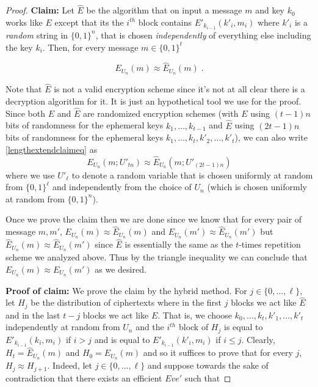 \begin{proof}
\textbf{Claim:} Let \(\hat{E}\) be the algorithm that on input a message
\(m\) and key \(k_0\) works like \(E\) except that its the \(i^{th}\)
block contains \(E'_{k_{i-1}}(k'_i,m_i)\) where \(k'_i\) is a
\emph{random} string in \({\{0,1\}}^n\), that is chosen
\emph{independently} of everything else including the key \(k_i\). Then,
for every message \(m\in{\{0,1\}}^t\)

\[
E_{U_n}(m) \approx \hat{E}_{U_n}(m)  \label{lengthextendclaimeq} \;.
\]

Note that \(\hat{E}\) is not a valid encryption scheme since it's not at
all clear there is a decryption algorithm for it. It is just an
hypothetical tool we use for the proof. Since both \(E\) and \(\hat{E}\)
are randomized encryption schemes (with \(E\) using \((t-1)n\) bits of
randomness for the ephemeral keys \(k_1,\ldots,k_{t-1}\) and \(\hat{E}\)
using \((2t-1)n\) bits of randomness for the ephemeral keys
\(k_1,\ldots,k_t,k'_2,\ldots,k'_t\)), we can also write
\eqref{lengthextendclaimeq} as \[
E_{U_n}(m; U'_{tn}) \approx \hat{E}_{U_n}(m; U'_{(2t-1)n})  
\] where we use \(U'_\ell\) to denote a random variable that is chosen
uniformly at random from \(\{0,1\}^\ell\) and independently from the
choice of \(U_n\) (which is chosen uniformly at random from
\(\{0,1\}^n\)).

Once we prove the claim then we are done since we know that for every
pair of message \(m,m'\), \(E_{U_n}(m) \approx \hat{E}_{U_n}(m)\) and
\(E_{U_n}(m') \approx \hat{E}_{U_n}(m')\) but
\(\hat{E}_{U_n}(m) \approx \hat{E}_{U_n}(m')\) since \(\hat{E}\) is
essentially the same as the \(t\)-times repetition scheme we analyzed
above. Thus by the triangle inequality we can conclude that
\(E_{U_n}(m) \approx E_{U_n}(m')\) as we desired.

\textbf{Proof of claim:} We prove the claim by the hybrid method. For
\(j\in \{0,\ldots, \ell\}\), let \(H_j\) be the distribution of
ciphertexts where in the first \(j\) blocks we act like \(\hat{E}\) and
in the last \(t-j\) blocks we act like \(E\). That is, we choose
\(k_0,\ldots,k_t,k'_1,\ldots,k'_t\) independently at random from \(U_n\)
and the \(i^{th}\) block of \(H_j\) is equal to
\(E'_{k_{i-1}}(k_i,m_i)\) if \(i>j\) and is equal to
\(E'_{k_{i-1}}(k'_i,m_i)\) if \(i\leq j\). Clearly,
\(H_t = \hat{E}_{U_n}(m)\) and \(H_0 = E_{U_n}(m)\) and so it suffices
to prove that for every \(j\), \(H_j \approx H_{j+1}\). Indeed, let
\(j \in \{0,\ldots,\ell\}\) and suppose towards the sake of
contradiction that there exists an efficient \(Eve'\) such that


\end{proof}

